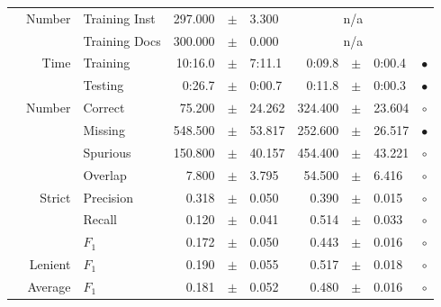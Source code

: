 \begin{longtable}{|r|r|l||rcl|rcl|c|}
\cline{2-10} & \multirow{2}{*}{    Number} &   Training Inst &     297.000 &  $\pm$  &       3.300 &    \multicolumn{3}{c|}{n/a}         &  \\
\cline{3-10} &                             &   Training Docs &     300.000 &  $\pm$  &       0.000 &    \multicolumn{3}{c|}{n/a}         &  \\
\cline{2-10} & \multirow{2}{*}{      Time} &        Training &     10:16.0 &  $\pm$  &      7:11.1 &      0:09.8 &  $\pm$  &      0:00.4 & $\bullet$ \\
\cline{3-10} &                             &         Testing &      0:26.7 &  $\pm$  &      0:00.7 &      0:11.8 &  $\pm$  &      0:00.3 & $\bullet$ \\
\hline
\pagebreak
\hline
\hline
\multirow{11}{*}{\begin{sideways}purchabr\end{sideways} }
             & \multirow{4}{*}{    Number} &         Correct &      75.200 &  $\pm$  &      24.262 &     324.400 &  $\pm$  &      23.604 & $\circ$ \\
\cline{3-10} &                             &         Missing &     548.500 &  $\pm$  &      53.817 &     252.600 &  $\pm$  &      26.517 & $\bullet$ \\
\cline{3-10} &                             &        Spurious &     150.800 &  $\pm$  &      40.157 &     454.400 &  $\pm$  &      43.221 & $\circ$ \\
\cline{3-10} &                             &         Overlap &       7.800 &  $\pm$  &       3.795 &      54.500 &  $\pm$  &       6.416 & $\circ$ \\
\cline{2-10} & \multirow{3}{*}{    Strict} &       Precision &       0.318 &  $\pm$  &       0.050 &       0.390 &  $\pm$  &       0.015 & $\circ$ \\
\cline{3-10} &                             &          Recall &       0.120 &  $\pm$  &       0.041 &       0.514 &  $\pm$  &       0.033 & $\circ$ \\
\cline{3-10} &                             &           $F_1$ &       0.172 &  $\pm$  &       0.050 &       0.443 &  $\pm$  &       0.016 & $\circ$ \\
\cline{2-10} &                     Lenient &           $F_1$ &       0.190 &  $\pm$  &       0.055 &       0.517 &  $\pm$  &       0.018 & $\circ$ \\
\cline{2-10} &                     Average &           $F_1$ &       0.181 &  $\pm$  &       0.052 &       0.480 &  $\pm$  &       0.016 & $\circ$ \\

\end{longtable}

